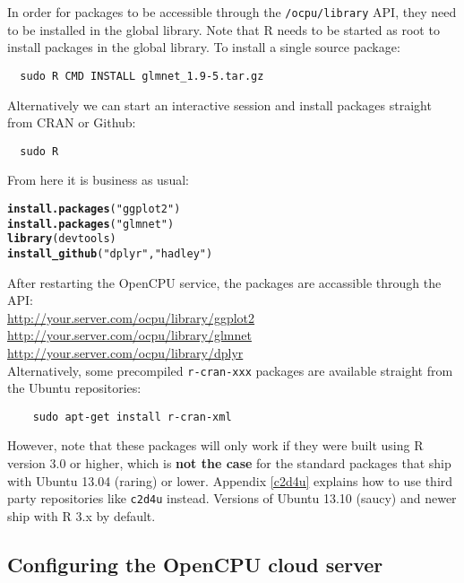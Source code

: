 \documentclass{scrartcl}\usepackage[]{graphicx}\usepackage[]{color}
\makeatletter
\newcommand{\hlstr}[1]{\textcolor[rgb]{0.192,0.494,0.8}{#1}}%
\newcommand{\hlstd}[1]{\textcolor[rgb]{0.345,0.345,0.345}{#1}}%
\newcommand{\hlkwd}[1]{\textcolor[rgb]{0.737,0.353,0.396}{\textbf{#1}}}%
\newenvironment{kframe}{%
 \def\at@end@of@kframe{}%
 \ifinner\ifhmode%
  \def\at@end@of@kframe{\end{minipage}}%
  \begin{minipage}{\columnwidth}%
 \fi\fi%
 \def\FrameCommand##1{\hskip\@totalleftmargin \hskip-\fboxsep
 \colorbox{shadecolor}{##1}\hskip-\fboxsep
     \hskip-\linewidth \hskip-\@totalleftmargin \hskip\columnwidth}%
 \MakeFramed {\advance\hsize-\width
   \@totalleftmargin\z@ \linewidth\hsize
   \@setminipage}}%
 {\par\unskip\endMakeFramed%
 \at@end@of@kframe}
\newenvironment{knitrout}{}{} %
\makeatother
\begin{document}
In order for packages to be accessible through the \texttt{/ocpu/library} API, they need to be installed in the global library. Note that R needs to be started as root to install packages in the global library. To install a single source package:
\begin{verbatim}
  sudo R CMD INSTALL glmnet_1.9-5.tar.gz
\end{verbatim}
Alternatively we can start an interactive session and install packages straight from CRAN or Github:
\begin{verbatim}
  sudo R
\end{verbatim}
From here it is business as usual:
\begin{knitrout}
\color{fgcolor}\begin{kframe}
\begin{alltt}
\hlkwd{install.packages}\hlstd{(}\hlstr{"ggplot2"}\hlstd{)}
\hlkwd{install.packages}\hlstd{(}\hlstr{"glmnet"}\hlstd{)}
\hlkwd{library}\hlstd{(devtools)}
\hlkwd{install_github}\hlstd{(}\hlstr{"dplyr"}\hlstd{,} \hlstr{"hadley"}\hlstd{)}
\end{alltt}
\end{kframe}
\end{knitrout}

\noindent After restarting the OpenCPU service, the packages are accassible through the API:\\

\indent \url{http://your.server.com/ocpu/library/ggplot2} \\
\indent \url{http://your.server.com/ocpu/library/glmnet} \\
\indent \url{http://your.server.com/ocpu/library/dplyr} \\

\noindent Alternatively, some precompiled \texttt{r-cran-xxx} packages are available straight from the Ubuntu repositories:
\begin{verbatim}
    sudo apt-get install r-cran-xml
\end{verbatim}
However, note that these packages will only work if they were built using R version 3.0 or higher, which is \textbf{not the case} for the standard packages that ship with Ubuntu 13.04 (raring) or lower. Appendix \ref{c2d4u} explains how to use third party repositories like \texttt{c2d4u} instead. Versions of Ubuntu 13.10 (saucy) and newer ship with R 3.x by default. 

\subsection{Configuring the OpenCPU cloud server}
\end{document}
